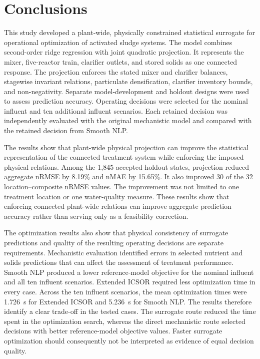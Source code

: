 \documentclass[a4paper,fleqn]{cas-sc}
\begin{document}
\FloatBarrier

\section{Conclusions}

This study developed a plant-wide, physically constrained statistical surrogate for operational optimization of activated sludge systems. The model combines second-order ridge regression with joint quadratic projection. It represents the mixer, five-reactor train, clarifier outlets, and stored solids as one connected response. The projection enforces the stated mixer and clarifier balances, stagewise invariant relations, particulate densification, clarifier inventory bounds, and non-negativity. Separate model-development and holdout designs were used to assess prediction accuracy. Operating decisions were selected for the nominal influent and ten additional influent scenarios. Each retained decision was independently evaluated with the original mechanistic model and compared with the retained decision from Smooth NLP.

The results show that plant-wide physical projection can improve the statistical representation of the connected treatment system while enforcing the imposed physical relations. Among the 1,845 accepted holdout states, projection reduced aggregate nRMSE by 8.19\% and nMAE by 15.65\%. It also improved 30 of the 32 location--composite nRMSE values. The improvement was not limited to one treatment location or one water-quality measure. These results show that enforcing connected plant-wide relations can improve aggregate prediction accuracy rather than serving only as a feasibility correction.

The optimization results also show that physical consistency of surrogate predictions and quality of the resulting operating decisions are separate requirements. Mechanistic evaluation identified errors in selected nutrient and solids predictions that can affect the assessment of treatment performance. Smooth NLP produced a lower reference-model objective for the nominal influent and all ten influent scenarios. Extended ICSOR required less optimization time in every case. Across the ten influent scenarios, the mean optimization times were 1.726~s for Extended ICSOR and 5.236~s for Smooth NLP. The results therefore identify a clear trade-off in the tested cases. The surrogate route reduced the time spent in the optimization search, whereas the direct mechanistic route selected decisions with better reference-model objective values. Faster surrogate optimization should consequently not be interpreted as evidence of equal decision quality.
\end{document}
